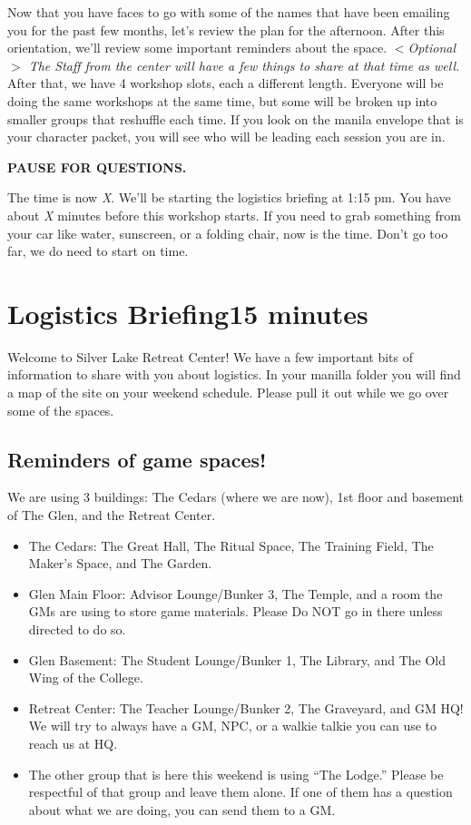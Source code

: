 \documentclass[green]{GL2020}
\begin{document}
Now that you have faces to go with some of the names that have been emailing you for the past few months, let’s review the plan for the afternoon. After this orientation, we'll review some important reminders about the space. \emph{$<$Optional$>$ The Staff from the center will have a few things to share at that time as well.} After that, we have 4 workshop slots, each a different length. Everyone will be doing the same workshops at the same time, but some will be broken up into smaller groups that reshuffle each time. If you look on the manila envelope that is your character packet, you will see who will be leading each session you are in. 

\textbf{PAUSE FOR QUESTIONS.}

The time is now \emph{X}. We'll be starting the logistics briefing at 1:15 pm. You have about \emph{X} minutes before this workshop starts. If you need to grab something from your car like water, sunscreen, or a folding chair, now is the time. Don't go too far, we do need to start on time.

\section*{Logistics Briefing{{15 minutes}}}

Welcome to Silver Lake Retreat Center!  We have a few important bits of information to share with you about logistics. In your manilla folder you will find a map of the site on your weekend schedule.  Please pull it out while we go over some of the spaces. 

\subsection*{Reminders of game spaces!}
We are using 3 buildings: The Cedars (where we are now), 1st floor and basement of The Glen, and the Retreat Center.
\begin{itemize}
	\item The Cedars: The Great Hall, The Ritual Space, The Training Field, The Maker's Space, and The Garden.
	\item Glen Main Floor: Advisor Lounge/Bunker 3, The Temple, and a room the GMs are using to store game materials. Please Do NOT go in there unless directed to do so.
	\item Glen Basement: The Student Lounge/Bunker 1, The Library, and The Old Wing of the College.
	\item Retreat Center: The Teacher Lounge/Bunker 2, The Graveyard, and GM HQ! We will try to always have a GM, NPC, or a walkie talkie you can use to reach us at HQ.
	\item The other group that is here this weekend is using ``The Lodge.'' Please be respectful of that group and leave them alone. If one of them has a question about what we are doing, you can send them to a GM.
\end{itemize}
\end{document}
